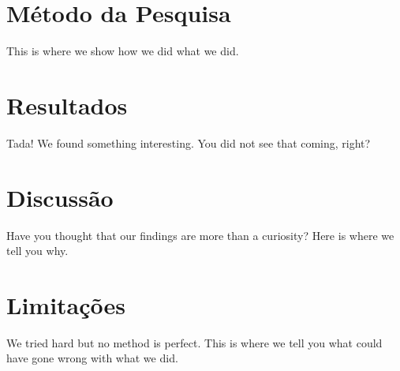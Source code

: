\documentclass[sigconf]{acmart}
\begin{document}
\section{Método da Pesquisa}
\label{sec:metodo}


This is where we show how we did what we did.














\section{Resultados}
\label{sec:resultados}

Tada! We found something interesting. You did not see that coming, right?











\section{Discussão}
\label{sec:discussao}
Have you thought that our findings are more than a curiosity? Here is where we tell you why.










\section{Limitações}
\label{sec:limitacoes}


We tried hard but no method is perfect. This is where we tell you what could have gone wrong with what we did.
\end{document}

